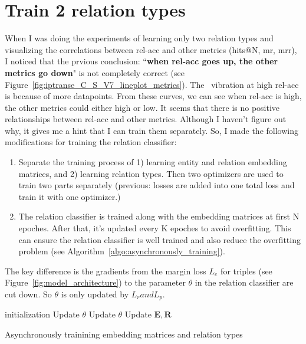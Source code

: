 \section{Train 2 relation types}
When I was doing the experiments of learning only two relation types and visualizing the correlations between rel-acc and other metrics (hits@N, mr, mrr), I noticed that the prvious conclusion: ``\textbf{when rel-acc goes up, the other metrics go down}" is not completely correct (see Figure~\ref{fig:iptranse_C_S_V7_lineplot_metrics}). The  vibration at high rel-acc is because of more datapoints. From these curves, we can see when rel-acc is high, the other metrics could either high or low. It seems that there is no positive relationships between rel-acc and other metrics. 
Although I haven't figure out why, it gives me a hint that I can train them separately. %
So, I made the following modifications for training the relation classifier:
\begin{enumerate}
    \item Separate the training process of 1) learning entity and relation embedding matrices, and 2) learning relation types. Then two optimizers are used to train two parts separately (previous: losses are added into one total loss and train it with one optimizer.)  
    \item The relation classifier is trained along with the embedding matrices at first N epoches. After that, it's updated every K epoches to avoid overfitting. This can ensure the relation classifier is well trained and also reduce the overfitting problem (see Algorithm~\ref{algo:asynchronously_training}).
\end{enumerate}

    The key difference is the gradients from the margin loss $L_e$ for triples  (see Figure~\ref{fig:model_architecture}) to the parameter $\theta$ in the relation classifier are cut down. So $\theta$ is only updated by $L_r and L_p$. 

\begin{algorithm}[H]
    \SetAlgoLined
     initialization\;
      {
             {
                Update $\theta$
            } {
              {
                Update $\theta$ } 
            }
                Update $\mathbf{E}, \mathbf{R}$
      }
    \caption{\label{algo:asynchronously_training} Asynchronously trainining embedding matrices and relation types}
    \end{algorithm}

